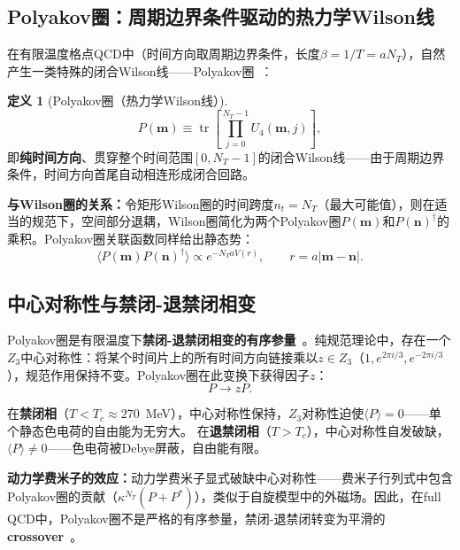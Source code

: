 \documentclass[12pt,a4paper]{ctexart}
\theoremstyle{definition}
\newtheorem{definition}{定义}[section]
\begin{document}
\subsection{Polyakov圈：周期边界条件驱动的热力学Wilson线}

在有限温度格点QCD中（时间方向取周期边界条件，长度$\beta = 1/T = aN_T$），自然产生一类特殊的闭合Wilson线——Polyakov圈~\cite{GattringerLang2010,Gupta1997intro}：

\begin{definition}[Polyakov圈（热力学Wilson线）]
\begin{equation}
P(\mathbf{m}) \equiv \operatorname{tr}\!\left[ \prod_{j=0}^{N_T-1} U_4(\mathbf{m}, j) \right],
\label{eq:polyakov_loop}
\end{equation}
即\textbf{纯时间方向}、贯穿整个时间范围$[0, N_T-1]$的闭合Wilson线——由于周期边界条件，时间方向首尾自动相连形成闭合回路。
\end{definition}

\textbf{与Wilson圈的关系：}令矩形Wilson圈的时间跨度$n_t = N_T$（最大可能值），则在适当的规范下，空间部分退耦，Wilson圈简化为两个Polyakov圈$P(\mathbf{m})$和$P(\mathbf{n})^\dagger$的乘积。Polyakov圈关联函数同样给出静态势：
\begin{equation}
\langle P(\mathbf{m}) P(\mathbf{n})^\dagger \rangle \propto e^{-N_T a V(r)}, \qquad r = a|\mathbf{m}-\mathbf{n}|.
\label{eq:polyakov_correlator}
\end{equation}

\subsection{中心对称性与禁闭-退禁闭相变}

Polyakov圈是有限温度下\textbf{禁闭-退禁闭相变的有序参量}~\cite{GattringerLang2010}。纯规范理论中，存在一个$Z_3$中心对称性：将某个时间片上的所有时间方向链接乘以$z\in Z_3$（$1, e^{2\pi i/3}, e^{-2\pi i/3}$），规范作用保持不变。Polyakov圈在此变换下获得因子$z$：
\begin{equation}
P \to zP.
\label{eq:center_transform}
\end{equation}

在\textbf{禁闭相}（$T < T_c \approx 270$~MeV），中心对称性保持，$Z_3$对称性迫使$\langle P \rangle = 0$——单个静态色电荷的自由能为无穷大。
在\textbf{退禁闭相}（$T > T_c$），中心对称性自发破缺，$\langle P \rangle \neq 0$——色电荷被Debye屏蔽，自由能有限。

\textbf{动力学费米子的效应：}动力学费米子显式破缺中心对称性——费米子行列式中包含Polyakov圈的贡献（$\kappa^{N_T}(P+P^*)$），类似于自旋模型中的外磁场。因此，在full QCD中，Polyakov圈不是严格的有序参量，禁闭-退禁闭转变为平滑的\textbf{crossover}~\cite{GattringerLang2010}。
\end{document}
